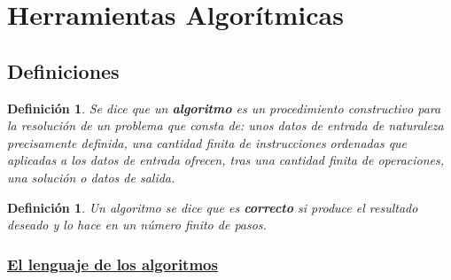 \documentclass[ebook,oneside]{memoir}
\newtheorem{defn}[thm]{Definición}
\begin{document}
\section{Herramientas Algorítmicas}

\subsection{Definiciones}

\begin{defn}
Se dice que un \textbf{algoritmo} es un procedimiento constructivo para la resoluci\'{o}n de un problema que consta de: unos \emph{datos de entrada} de naturaleza precisamente definida, una cantidad finita de \emph{instrucciones} ordenadas que aplicadas a los datos de entrada ofrecen, tras una cantidad finita de operaciones, una soluci\'{o}n o \emph{datos de salida}.
\end{defn}

\begin{defn}
Un algoritmo se dice que es \textbf{correcto} si produce el resultado deseado y lo hace en un n\'{u}mero finito de pasos.
\end{defn}


\subsubsection{\underline{El lenguaje de los algoritmos}}
\end{document}
